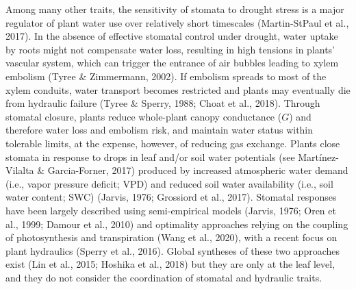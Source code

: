\documentclass[11pt,twoside]{reedthesis}
\begin{document}
Among many other traits, the sensitivity of stomata to drought stress is
a major regulator of plant water use over relatively short timescales
(Martin-StPaul et al., 2017). In the absence of effective stomatal
control under drought, water uptake by roots might not compensate water
loss, resulting in high tensions in plants' vascular system, which can
trigger the entrance of air bubbles leading to xylem embolism (Tyree \&
Zimmermann, 2002). If embolism spreads to most of the xylem conduits,
water transport becomes restricted and plants may eventually die from
hydraulic failure (Tyree \& Sperry, 1988; Choat et al., 2018). Through
stomatal closure, plants reduce whole-plant canopy conductance (\(G\))
and therefore water loss and embolism risk, and maintain water status
within tolerable limits, at the expense, however, of reducing gas
exchange. Plants close stomata in response to drops in leaf and/or soil
water potentials (see Martínez-Vilalta \& Garcia-Forner, 2017) produced
by increased atmospheric water demand (i.e., vapor pressure deficit;
VPD) and reduced soil water availability (i.e., soil water content; SWC)
(Jarvis, 1976; Grossiord et al., 2017). Stomatal responses have been
largely described using semi-empirical models (Jarvis, 1976; Oren et
al., 1999; Damour et al., 2010) and optimality approaches relying on the
coupling of photosynthesis and transpiration (Wang et al., 2020), with a
recent focus on plant hydraulics (Sperry et al., 2016). Global syntheses
of these two approaches exist (Lin et al., 2015; Hoshika et al., 2018)
but they are only at the leaf level, and they do not consider the
coordination of stomatal and hydraulic traits.\par 
\end{document}
